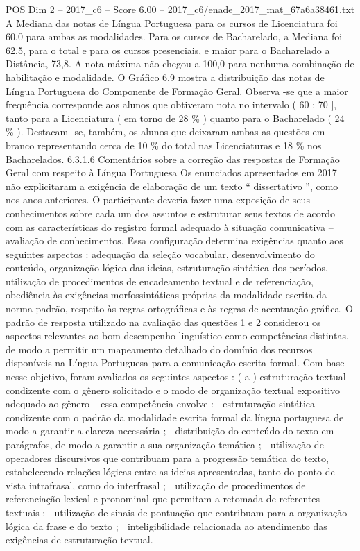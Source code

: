 \begin{textsample}{POS Dim 2 – 2017\_c6 – Score 6.00 – 2017\_c6/enade\_2017\_mat\_67a6a38461.txt}
A Mediana das notas de Língua Portuguesa para os cursos de Licenciatura foi 60,0 para ambas as modalidades.
Para os cursos de Bacharelado, a Mediana foi 62,5, para o total e para os cursos presenciais, e maior para o Bacharelado a Distância, 73,8.
A nota máxima não chegou a 100,0 para nenhuma combinação de habilitação e modalidade.
O Gráfico 6.9 mostra a distribuição das notas de Língua Portuguesa do Componente de Formação Geral.
Observa -se que a maior frequência corresponde aos alunos que obtiveram nota no intervalo ( 60 ; 70 ], tanto para a Licenciatura ( em torno de 28 \% ) quanto para o Bacharelado ( 24 \% ).
Destacam -se, também, os alunos que deixaram ambas as questões em branco representando cerca de 10 \% do total nas Licenciaturas e 18 \% nos Bacharelados. 6.3.1.6 Comentários sobre a correção das respostas de Formação Geral com respeito à Língua Portuguesa Os enunciados apresentados em 2017 não explicitaram a exigência de elaboração de um texto “ dissertativo ”, como nos anos anteriores.
O participante deveria fazer uma exposição de seus conhecimentos sobre cada um dos assuntos e estruturar seus textos de acordo com as características do registro formal adequado à situação comunicativa – avaliação de conhecimentos.
Essa configuração determina exigências quanto aos seguintes aspectos : adequação da seleção vocabular, desenvolvimento do conteúdo, organização lógica das ideias, estruturação sintática dos períodos, utilização de procedimentos de encadeamento textual e de referenciação, obediência às exigências morfossintáticas próprias da modalidade escrita da norma-padrão, respeito às regras ortográficas e às regras de acentuação gráfica.
O padrão de resposta utilizado na avaliação das questões 1 e 2 considerou os aspectos relevantes ao bom desempenho linguístico como competências distintas, de modo a permitir um mapeamento detalhado do domínio dos recursos disponíveis na Língua Portuguesa para a comunicação escrita formal.
Com base nesse objetivo, foram avaliados os seguintes aspectos : ( a ) estruturação textual condizente com o gênero solicitado e o modo de organização textual expositivo adequado ao gênero – essa competência envolve :  estruturação sintática condizente com o padrão da modalidade escrita formal da língua portuguesa de modo a garantir a clareza necessária ;  distribuição do conteúdo do texto em parágrafos, de modo a garantir a sua organização temática ;  utilização de operadores discursivos que contribuam para a progressão temática do texto, estabelecendo relações lógicas entre as ideias apresentadas, tanto do ponto de vista intrafrasal, como do interfrasal ;  utilização de procedimentos de referenciação lexical e pronominal que permitam a retomada de referentes textuais ;  utilização de sinais de pontuação que contribuam para a organização lógica da frase e do texto ;  inteligibilidade relacionada ao atendimento das exigências de estruturação textual.

\end{textsample}
